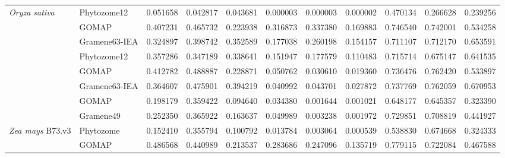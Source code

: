\documentclass[utf8]{frontiersSCNS}
\begin{document}
\begin{table}[t]
{\begin{threeparttable}
\begin{tabular}{llrr>{}r|rr>{}r|rrr}
\multirow{-3}{*}{\raggedright\arraybackslash \textit{Oryza sativa}} & Phytozome12 & 0.051658 & 0.042817 & 0.043681 & 0.000003 & 0.000003 & 0.000002 & 0.470134 & 0.266628 & 0.239256\\
\cmidrule{1-11}
\rowcolor{gray!6}   & GOMAP & 0.407231 & 0.465732 & 0.223938 & 0.316873 & 0.337380 & 0.169883 & 0.746540 & 0.742001 & 0.534258\\

 & Gramene63-IEA & 0.324897 & 0.398742 & 0.352589 & 0.177038 & 0.260198 & 0.154157 & 0.711107 & 0.712170 & 0.653591\\

\rowcolor{gray!6}  \multirow{-3}{*}{\raggedright\arraybackslash \textit{Sorghum bicolor}} & Phytozome12 & 0.357286 & 0.347189 & 0.338641 & 0.151947 & 0.177579 & 0.110483 & 0.715714 & 0.675147 & 0.641535\\
\cmidrule{1-11}
 & GOMAP & 0.412782 & 0.488887 & 0.228871 & 0.050762 & 0.030610 & 0.019360 & 0.736476 & 0.762420 & 0.533897\\

\rowcolor{gray!6}  \multirow{-2}{*}{\raggedright\arraybackslash \textit{Triticum aestivum}} & Gramene63-IEA & 0.364607 & 0.475901 & 0.394219 & 0.040992 & 0.043701 & 0.027872 & 0.737769 & 0.762059 & 0.670953\\
\cmidrule{1-11}
 & GOMAP & 0.198179 & 0.359422 & 0.094640 & 0.034380 & 0.001644 & 0.001021 & 0.648177 & 0.645357 & 0.323390\\

\rowcolor{gray!6}   & Gramene49 & 0.252350 & 0.365922 & 0.163637 & 0.049989 & 0.003238 & 0.001972 & 0.729851 & 0.708819 & 0.441927\\

\multirow{-3}{*}{\raggedright\arraybackslash \textit{Zea mays} B73.v3} & Phytozome & 0.152410 & 0.355794 & 0.100792 & 0.013784 & 0.003064 & 0.000539 & 0.538830 & 0.674668 & 0.324333\\
\cmidrule{1-11}
\rowcolor{gray!6}   & GOMAP & 0.486568 & 0.440989 & 0.213537 & 0.283686 & 0.247096 & 0.135719 & 0.779115 & 0.722084 & 0.467588\\


\end{tabular}
\end{threeparttable}}
\end{table}
\end{document}
